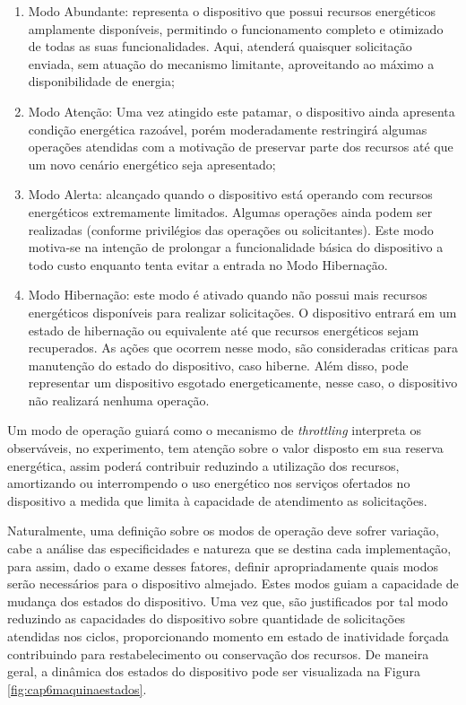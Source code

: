 \begin{enumerate}	
\item Modo Abundante:  representa o dispositivo que possui recursos energéticos amplamente disponíveis, permitindo o funcionamento completo e otimizado de todas as suas funcionalidades. Aqui, atenderá quaisquer solicitação enviada, sem atuação do mecanismo limitante, aproveitando ao máximo a disponibilidade de energia;
\item Modo Atenção: Uma vez atingido este patamar, o dispositivo ainda apresenta condição energética razoável, porém moderadamente restringirá algumas operações atendidas com a motivação de preservar parte dos recursos até que um novo cenário energético seja apresentado;
\item Modo Alerta: alcançado quando o dispositivo está operando com recursos energéticos extremamente limitados. Algumas operações ainda podem ser realizadas (conforme privilégios das operações ou solicitantes). Este modo motiva-se na intenção de prolongar a funcionalidade básica do dispositivo a todo custo enquanto tenta evitar a entrada no Modo Hibernação. 
\item Modo Hibernação: este modo é ativado quando não possui mais recursos energéticos disponíveis para realizar solicitações. O dispositivo entrará em um estado de hibernação ou equivalente até que recursos energéticos sejam recuperados. As ações que ocorrem nesse modo, são consideradas criticas para manutenção do estado do dispositivo, caso hiberne. Além disso, pode representar um dispositivo esgotado energeticamente, nesse caso, o dispositivo não realizará nenhuma operação.
\end{enumerate}

Um modo de operação guiará como o mecanismo de \textit{throttling} interpreta os observáveis, no experimento, tem atenção sobre o valor disposto em sua reserva energética, assim poderá contribuir reduzindo a utilização dos recursos, amortizando ou interrompendo o uso energético nos serviços ofertados no dispositivo a medida que limita à capacidade de atendimento as solicitações. 

Naturalmente, uma definição sobre os modos de operação deve sofrer variação, cabe a análise das especificidades e natureza que se destina cada implementação, para assim, dado o exame desses fatores, definir apropriadamente quais modos serão necessários para o dispositivo almejado. Estes modos guiam a capacidade de mudança dos estados do dispositivo. Uma vez que, são justificados por tal modo reduzindo as capacidades do dispositivo sobre quantidade de solicitações atendidas nos ciclos, proporcionando momento em estado de inatividade forçada contribuindo para restabelecimento ou conservação dos recursos. De maneira geral, a dinâmica dos estados do dispositivo pode ser visualizada na Figura \ref{fig:cap6maquinaestados}. 


